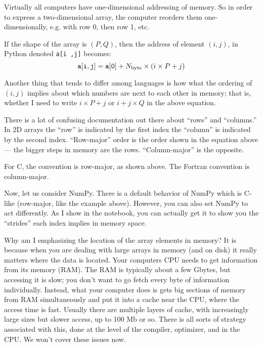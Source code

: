 Virtually all computers have one-dimensional addressing of memory. So
in order to express a two-dimensional array, the computer reorders
them one-dimensionally, e.g. with row 0, then row 1, etc.


\begin{answer}
If the
shape of the array is $(P, Q)$, then the address of element $(i,j)$,
in Python denoted {\tt{a[i ,j]}} becomes:
\begin{equation}
  {\tt a[i, j]} = {\tt a[0]} + N_{\rm byte} \times (i \times P + j)
\end{equation}

Another thing that tends to differ among languages is how what the
ordering of $(i, j)$ implies about which numbers are next to each
other in memory; that is, whether I need to write $i\times P +j$ or $i
+ j\times Q$ in the above equation.

There is a lot of confusing documentation out there about ``rows'' and
``columns.'' In 2D arrays the ``row'' is indicated by the first index
the ``column'' is indicated by the second index. ``Row-major'' order
is the order shown in the equation above --- the bigger steps in
memory are the rows.  ``Column-major'' is the opposite.

For C, the convention is row-major, as shown above. The Fortran
convention is column-major.

Now, let us consider NumPy. There is a default behavior of NumPy which
is C-like (row-major, like the example above). However, you can also
set NumPy to act differently. As I show in the notebook, you can
actually get it to show you the ``strides'' each index implies in
memory space.
\end{answer}

Why am I emphasizing the location of the array elements in memory? It
is because when you are dealing with large arrays in memory (and on
disk) it really matters where the data is located. Your computers CPU
needs to get information from its memory (RAM). The RAM is typically
about a few Gbytes, but accessing it is slow; you don't want to go
fetch every byte of information individually. Instead, what your
computer does is gets big sections of memory from RAM simultaneously
and put it into a cache near the CPU, where the access time is
fast. Usually there are multiple layers of cache, with increasingly
large sizes but slower access, up to 100 Mb or so. There is all sorts
of strategy associated with this, done at the level of the compiler,
optimizer, and in the CPU. We won't cover these issues now.

